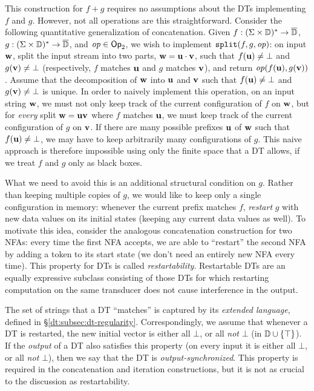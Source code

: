 This construction for $f+g$ requires no assumptions about the DTs implementing $f$ and $g$.
However, not all operations are this straightforward.
Consider the following quantitative generalization of concatenation. Given $f: (\Sigma \times \mathbb{D})^{*} \to \overline{\mathbb{D}{}}$, $g: (\Sigma \times \mathbb{D})^{*} \to \overline{\mathbb{D}{}}$, and $\mathit{op} \in \textsf{Op}_2$, we wish to implement $\texttt{split}(f,g,\mathit{op})$:
on input $\textbf{w}$, split the input stream into two parts, $\textbf{w} = \textbf{u} \cdot \textbf{v}$, such that $f(\textbf{u}) \ne \bot$ and $g(\textbf{v}) \ne \bot$ (respectively, $f$ matches $\textbf{u}$ and $g$ matches $\textbf{v}$), and return $\mathit{op}(f(\textbf{u}),g(\textbf{v}))$. Assume that the decomposition of $\textbf{w}$ into $\textbf{u}$ and $\textbf{v}$ such that $f(\textbf{u}) \ne \bot$ and $g(\textbf{v}) \ne \bot$ is unique.
In order to naively implement this operation, on an input string $\textbf{w}$, we must not only keep track of the current
configuration of $f$ on $\textbf{w}$,
but for \emph{every} split $\textbf{w} = \textbf{u} \textbf{v}$ where $f$ matches $\textbf{u}$,
we must keep track of the current configuration of $g$ on $\textbf{v}$.
If there are many possible prefixes $\textbf{u}$ of $\textbf{w}$ such that $f(\textbf{u}) \ne \bot$, we may have to keep arbitrarily many configurations of $g$. This naive approach is therefore impossible using only the finite space that a DT allows, if we treat $f$ and $g$ only as black boxes.

What we need to avoid this is an additional structural condition on $g$. Rather than keeping multiple copies of $g$, we would like to keep only a single configuration in memory: whenever the current prefix matches $f$, \emph{restart} $g$ with new data values on its initial states (keeping any current data values as well).
To motivate this idea, consider the analogous concatenation construction for two NFAs: every time the first NFA accepts, we are able to ``restart'' the second NFA by adding a token to its start state (we don't need an entirely new NFA every time).
This property for DTs is called \emph{restartability}.
Restartable DTs are an equally expressive subclass
consisting of those DTs for which restarting computation on the same transducer does not cause interference in the output.

The set of strings that a DT ``matches'' is captured by its \emph{extended language}, defined in \S\ref{dt:subsec:dt-regularity}. Correspondingly, we assume that whenever a DT is restarted, the new initial vector is either all $\bot$, or all \emph{not} $\bot$ (in $\mathbb{D} \cup \{\top\}$). If the \emph{output} of a DT also satisfies this property (on every input it is either all $\bot$, or all \emph{not} $\bot$), then we say that the DT is \emph{output-synchronized}. This property is required in the concatenation and iteration constructions, but it is not as crucial to the discussion as restartability.

